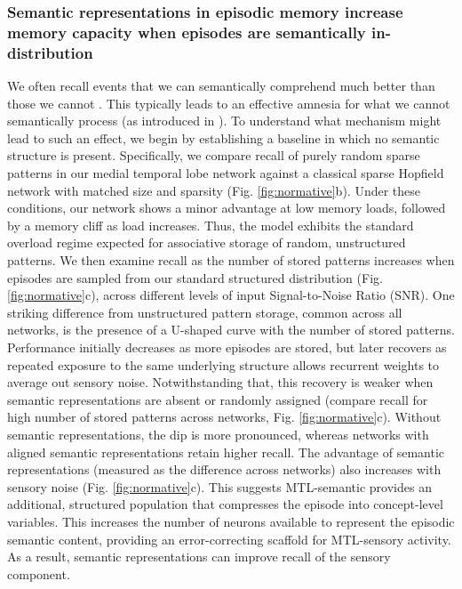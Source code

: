 \documentclass{article}
\begin{document}
\subsubsection*{Semantic representations in episodic memory increase memory capacity when episodes are semantically in-distribution}
We often recall events that we can semantically comprehend much better than those we cannot . This typically leads to an effective amnesia for what we cannot semantically process (as introduced in ). To understand what mechanism might lead to such an effect, we begin by establishing a baseline in which no semantic structure is present. Specifically, we compare recall of purely random sparse patterns in our medial temporal lobe network against a classical sparse Hopfield network with matched size and sparsity (Fig. \ref{fig:normative}b). Under these conditions, our network shows a minor advantage at low memory loads, followed by a memory cliff as load increases. Thus, the model exhibits the standard overload regime expected for associative storage of random, unstructured patterns.
\newline\newline
We then examine recall as the number of stored patterns increases when episodes are sampled from our standard structured distribution (Fig. \ref{fig:normative}c), across different levels of input Signal-to-Noise Ratio (SNR). One striking difference from unstructured pattern storage, common across all networks, is the presence of a U-shaped curve with the number of stored patterns. Performance initially decreases as more episodes are stored, but later recovers as repeated exposure to the same underlying structure allows recurrent weights to average out sensory noise.
\newline\newline
Notwithstanding that, this recovery is weaker when semantic representations are absent or randomly assigned (compare recall for high number of stored patterns across networks, Fig. \ref{fig:normative}c). Without semantic representations, the dip is more pronounced, whereas networks with aligned semantic representations retain higher recall. The advantage of semantic representations (measured as the difference across networks) also increases with sensory noise (Fig. \ref{fig:normative}c). This suggests MTL-semantic provides an additional, structured population that compresses the episode into concept-level variables. This increases the number of neurons available to represent the episodic semantic content, providing an error-correcting scaffold for MTL-sensory activity. As a result, semantic representations can improve recall of the sensory component.
\end{document}
